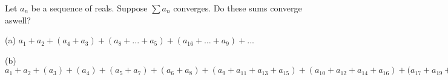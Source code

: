 Let $a_n$ be a sequence of reals. Suppose $\sum a_n$ converges. Do these sums converge aswell?

(a) $a_1+a_2+(a_4+a_3)+(a_8+...+a_5)+(a_{16}+...+a_9)+...$

(b) ${a_1+a_2+(a_3)+(a_4)+(a_5+a_7)+(a_6+a_8)+(a_9+a_{11}+a_{13}+a_{15})+(a_{10}+a_{12}+a_{14}+a_{16})+(a_{17}+a_{19}+...}$